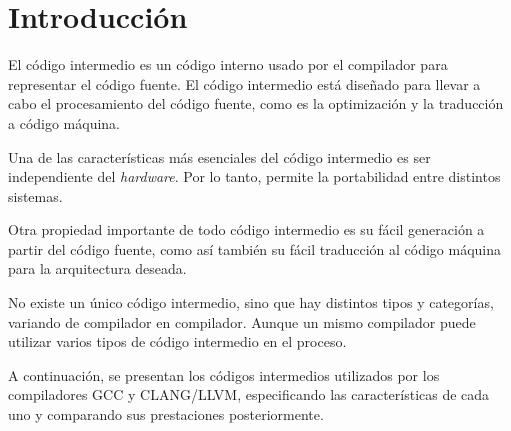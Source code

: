 \chapter{Introducción}

El código intermedio es un código interno usado por el compilador para 
representar el código fuente. El código intermedio está diseñado para llevar a cabo 
el procesamiento del código fuente, como es la optimización y la traducción a código máquina. 

Una de las características más esenciales del código intermedio es ser 
independiente del \emph{hardware}. Por lo tanto, permite la portabilidad entre distintos 
sistemas.

Otra propiedad importante de todo código intermedio es su fácil generación a partir del 
código fuente, como así también su fácil traducción al código máquina para la arquitectura 
deseada.

No existe un único código intermedio, sino que hay distintos tipos y categorías, variando 
de compilador en compilador. Aunque un mismo compilador puede utilizar varios tipos de 
código intermedio en el proceso\cite{craftinginterpreters}.

A continuación, se presentan los códigos intermedios utilizados por los compiladores 
GCC y CLANG/LLVM, especificando las características de cada uno y comparando sus 
prestaciones posteriormente.

